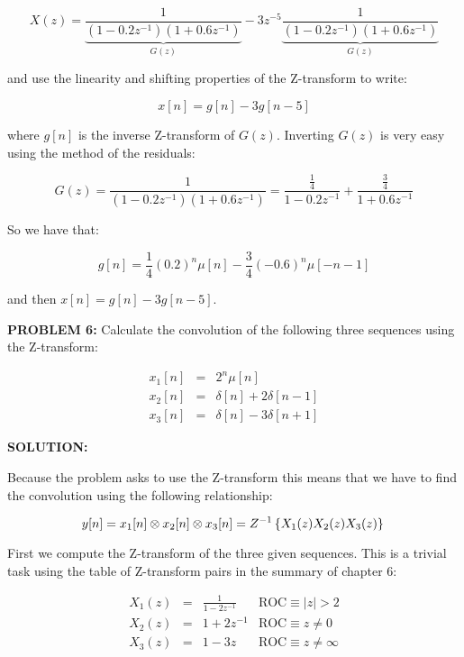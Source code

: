 \documentclass[a4paper,11pt,oneside]{article}
\begin{document}
\[
X(z)=\underbrace{\frac{1}{(1-0.2z^{-1})(1+0.6z^{-1})}}_{G(z)}-3z^{-5}\underbrace{\frac{1}{(1-0.2z^{-1})(1+0.6z^{-1})}}_{G(z)}
\]

and use the linearity and shifting properties of the Z-transform to write:

\[
x[n] = g[n] - 3g[n-5]
\]

where $g[n]$ is the inverse Z-transform of $G(z)$. Inverting $G(z)$ is very easy using the method of the residuals:

\[
G(z) = \frac{1}{(1-0.2z^{-1})(1+0.6z^{-1})}=\frac{\frac{1}{4}}{1-0.2z^{-1}}+\frac{\frac{3}{4}}{1+0.6z^{-1}}
\]

So we have that:

\[
g[n]=\frac{1}{4}(0.2)^n \mu[n]-\frac{3}{4}(-0.6)^n\mu[-n-1]
\]

and then $x[n] = g[n] - 3g[n-5]$.




\vspace{1cm}


\textbf{PROBLEM 6:} Calculate the convolution of the following three sequences using the Z-transform:

\begin{eqnarray}
x_1[n]&=&2^n\mu[n]\\
x_2[n]&=&\delta[n]+2\delta[n-1]\\
x_3[n]&=&\delta[n]-3\delta[n+1]
\end{eqnarray}


\vspace{1cm}
\textbf{SOLUTION:}

Because the problem asks to use the Z-transform this means that we have to find the convolution using the following relationship:

\begin{equation}
y[n]=x_1[n]\otimes x_2[n] \otimes x_3[n] = Z^{-1}\left\{X_1(z)X_2(z)X_3(z)\right\}\\
\end{equation}

First we compute the Z-transform of the three given sequences. This is a trivial task using the table of Z-transform pairs in the summary of chapter 6:

\begin{equation}
\begin{array}{llll}
X_1(z)&=&\frac{1}{1-2z^{-1}} & \textrm{ROC} \equiv |z|>2\\
X_2(z)&=&1+2z^{-1} & \textrm{ROC} \equiv z\neq 0\\
X_3(z)&=&1-3z & \textrm{ROC} \equiv z\neq \infty
\end{array}
\end{equation}
\end{document}
